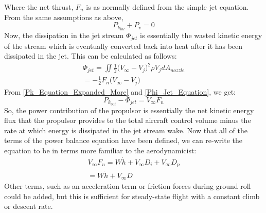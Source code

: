 					Where the net thrust, $F_n$ is as normally defined from the simple jet equation.  From the same assumptions as above, 
					\begin{equation}
						P_{k_{inl}} + P_v=0
						\label{Pk_and_Pv}
					\end{equation}
					Now, the dissipation in the jet stream $\Phi_{jet}$ is essentially the wasted kinetic energy of the stream which is eventually converted back into heat after it has been dissipated in the jet.  This can be calculated as follows:
					\begin{equation}
						\begin{aligned}
							\Phi_{jet} = \iint \frac{1}{2}\big(V_\infty - V_j \Big)^2 \rho V_j dA_{nozzle} \\
								      =- \frac{1}{2} F_n \Big(V_\infty-V_j\Big)
						\end{aligned}
						\label{Phi_Jet_Equation}
					\end{equation}
					From \ref{Pk_Equation_Expanded_More} and \ref{Phi_Jet_Equation}, we get:
					\begin{equation}
						P_{k_{out}}-\Phi_{jet}  = V_\infty F_n
						\label{Net_Thrust_Power}
					\end{equation}
					So, the power contribution of the propulsor is essentially the net kinetic energy flux that the propulsor provides to the total aircraft control volume minus the rate at which energy is dissipated in the jet stream wake.  Now that all of the terms of the power balance equation have been defined, we can re-write the equation to be in terms more familiar to the aerodynamicist:
					\begin{equation}
						\begin{aligned}
							V_\infty F_n = W\dot{h} + V_\infty D_i + V_\infty D_p \\
					 		= W\dot{h} + V_\infty D
							\label{Drag_Thrust_Equation}
						\end{aligned}
					\end{equation}
					Other terms, such as an acceleration term or friction forces during ground roll could be added, but this is sufficient for steady-state flight with a constant climb or descent rate.
